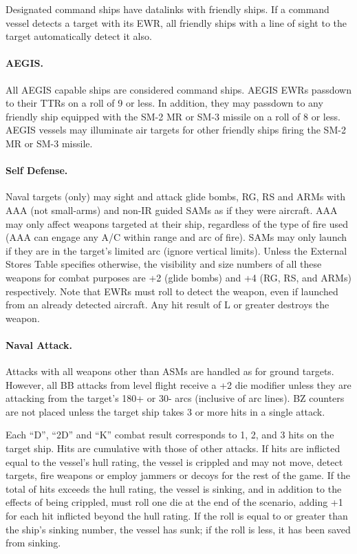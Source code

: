 Designated command ships have data\-links with friendly ships. If a command vessel detects a target with its EWR, all friendly ships with a line of sight to the target automatically detect it also.

\paragraph{AEGIS.}

All AEGIS capable ships are considered command ships.   AEGIS EWRs passdown to their TTRs on a roll of 9 or less.  In addition, they may passdown to any friendly ship equipped with the SM-2 MR or SM-3 missile on a roll of 8 or less.  AEGIS vessels may illuminate air targets for other friendly ships firing the SM-2 MR or SM-3 missile.

\paragraph{Self Defense.}  Naval targets (only) may sight and attack glide bombs, RG, RS and ARMs with AAA (not small-arms) and non-IR guided SAMs as if they were aircraft.  AAA may only affect weapons targeted at their ship, regardless of the type of fire used (AAA can engage any A/C within range and arc of fire).  SAMs may only launch if they are in the target's limited arc (ignore vertical limits).  Unless the External Stores Table specifies otherwise, the visibility and size numbers of all these weapons for combat purposes are +2 (glide bombs) and +4 (RG, RS, and ARMs) respectively.  Note that EWRs must roll to detect the weapon, even if launched from an already detected aircraft.  Any hit result of L or greater destroys the weapon.


\paragraph{Naval Attack.} Attacks with all weapons other than ASMs are handled as for ground targets.  However, all BB attacks from level flight receive a +2 die modifier unless they are attacking from the target's 180+ or 30- arcs (inclusive of arc lines).  BZ counters are not placed unless the target ship takes 3 or more hits in a single attack.

Each “D”, “2D” and “K” combat result corresponds to 1, 2, and 3 hits on the target ship.  Hits are cumulative with those of other attacks.   If hits are inflicted equal to the vessel's hull rating, the vessel is crippled and may not move, detect targets, fire weapons or employ jammers or decoys for the rest of the game.  If the total of hits exceeds the hull rating, the vessel is sinking, and in addition to the effects of being crippled, must roll one die at the end of the scenario, adding +1 for each hit inflicted beyond the hull rating.  If the roll is equal to or greater than the ship's sinking number, the vessel has sunk; if the roll is less, it has been saved from sinking.


